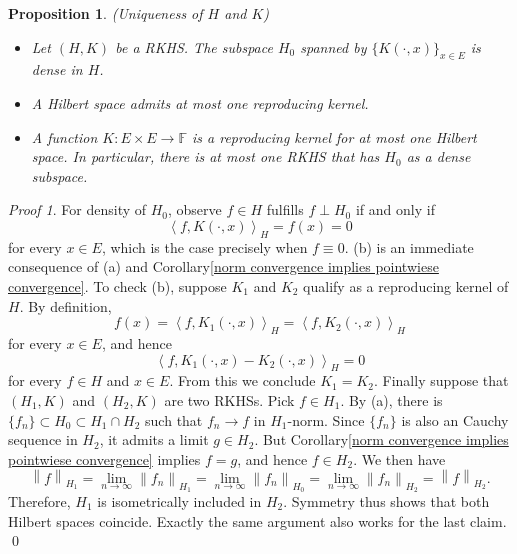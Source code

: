 \documentclass[a4paper,12pt]{article}
\newtheorem{prp}[thm]{Proposition}
\theoremstyle{remark}
\newtheorem*{prf}{Proof}
\theoremstyle{definition}
\theoremstyle{definition}
\theoremstyle{definition}
\newcommand{\ip}[2]{\left<#1, #2 \right>}
\newcommand{\norm}[1]{\left\| #1 \right\|}
\begin{document}
\begin{prp}(Uniqueness of \( H \) and \( K \))\label{Density and Unique of RKHS}

	\begin{itemize}
		\item[(a)] Let \( (H,K) \) be a RKHS. The subspace \( H_0 \) spanned by \( \{K(\cdot ,x) \} _{x \in E} \) is dense in \( H \).
		\item[(b)] A Hilbert space admits at most one reproducing kernel.
		\item[(c)] A function \( K:E \times E \to \mathbb{F} \) is a reproducing kernel for at most one Hilbert space. In particular, there is at most one RKHS that has \( H_0 \) as a dense subspace.
	\end{itemize}
\end{prp}
\begin{prf}
	For density of \( H_0 \), observe \( f \in H \) fulfills \( f \perp H_0 \) if and only if
	\begin{equation*}
		\ip{f}{K(\cdot ,x)}_H = f(x)=0
	\end{equation*}
	for every \( x \in E \), which is the case precisely when \( f \equiv 0 \).
	(b) is an immediate consequence of (a) and Corollary\ref{norm convergence implies pointwiese convergence}.
	To check (b), suppose \( K_1 \) and \( K_2 \) qualify as a reproducing kernel of \( H \). By definition,
	\begin{equation*}
		f(x) = \ip{f}{K_1(\cdot ,x)}_H =\ip{f}{K_2(\cdot ,x)}_H
	\end{equation*}
	for every \( x \in E \), and hence
	\begin{equation*}
		\ip{f}{K_1(\cdot ,x)- K_2(\cdot ,x)}_H = 0
	\end{equation*}
	for every \( f \in H \) and \( x \in E \). From this we conclude \( K_1 =K_2 \).
	Finally suppose that \( (H_1,K) \) and \( (H_2,K) \) are two RKHSs.
	Pick \( f \in H_1 \). By (a), there is \( \{f_n\} \subset H_0 \subset H_1 \cap H_2 \) such that \( f_n \to f \) in \( H_1 \)-norm. Since \( \{f_n\} \) is also an Cauchy sequence in \( H_2 \), it admits a limit \( g \in H_2 \). But Corollary\ref{norm convergence implies pointwiese convergence} implies \( f=g \), and hence \( f \in H_2 \). We then have
	\begin{equation*}
		\norm{f}_{H_1}
		= \lim_{n \to \infty} \norm{f_n}_{H_1}
		=\lim_{n \to \infty} \norm{f_n}_{H_0}
		=\lim_{n \to \infty} \norm{f_n}_{H_2}
		=\norm{f}_{H_2}.
	\end{equation*}
	Therefore, \( H_1 \) is isometrically included in \( H_2 \). Symmetry thus shows that both Hilbert spaces coincide. Exactly the same argument also works for the last claim.
	\qed\end{prf}
\end{document}

